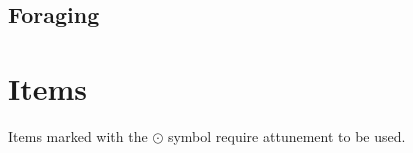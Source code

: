     \subsection*{Foraging} \label{ssec::foraging}

\section{Items} \label{sec::items}
    Items marked with the $\odot$ symbol require attunement to be used.

    \newpage~\newpage

    
    
